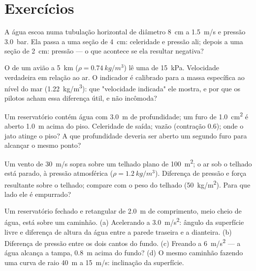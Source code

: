 \section{Exercícios}

\begin{exercise}[$\star$]\label{exo:b2:euler-bernoulli:1}
A água escoa numa tubulação horizontal de diâmetro \qty{8}{cm} a \qty{1.5}{m/s}
e pressão \qty{3.0}{bar}. Ela passa a uma seção de \qty{4}{cm}: celeridade
e pressão ali; depois a uma seção de \qty{2}{cm}: pressão --- o que acontece
se ela resultar negativa?
\end{exercise}

\begin{exercise}[$\star$]\label{exo:b2:euler-bernoulli:2}
O  de um avião a \qty{5}{km} ($\rho = \qty{0.74}{kg/m^3}$)
lê uma  de \qty{15}{kPa}. Velocidade verdadeira em relação ao ar. O
indicador é calibrado para a massa específica ao nível do mar (\qty{1.22}{kg/m^3}): que
"velocidade indicada" ele mostra, e por que os pilotos acham essa
diferença útil, e não incômoda?
\end{exercise}

\begin{exercise}[$\star$]\label{exo:b2:euler-bernoulli:3}
Um reservatório contém água com \qty{3.0}{m} de profundidade; um furo de \qty{1.0}{cm^2} é aberto
\qty{1.0}{m} acima do piso. Celeridade de saída; vazão (contração $0.6$);
onde o jato atinge o piso? A que profundidade deveria ser aberto um segundo furo
para alcançar o mesmo ponto?
\end{exercise}

\begin{exercise}[$\star$]\label{exo:b2:euler-bernoulli:4}
Um vento de \qty{30}{m/s} sopra sobre um telhado plano de \qty{100}{m^2}; o ar
sob o telhado está parado, à pressão atmosférica ($\rho = \qty{1.2}{kg/m^3}$).
Diferença de pressão e força resultante sobre o telhado; compare com o peso
do telhado (\qty{50}{kg/m^2}). Para que lado ele é empurrado?
\end{exercise}

\begin{exercise}[$\star\star$]\label{exo:b2:euler-bernoulli:5}
Um reservatório fechado e retangular de \qty{2.0}{m} de comprimento, meio cheio de água, está sobre um
caminhão. (a) Acelerando a \qty{3.0}{m/s^2}: ângulo da superfície livre
e diferença de altura da água entre a parede traseira e a dianteira.
(b) Diferença de pressão entre os dois cantos do fundo. (c)
Freando a \qty{6}{m/s^2} --- a água alcança a tampa, \qty{0.8}{m} acima
do fundo? (d) O mesmo caminhão fazendo uma curva de raio \qty{40}{m} a
\qty{15}{m/s}: inclinação da superfície.
\end{exercise}


